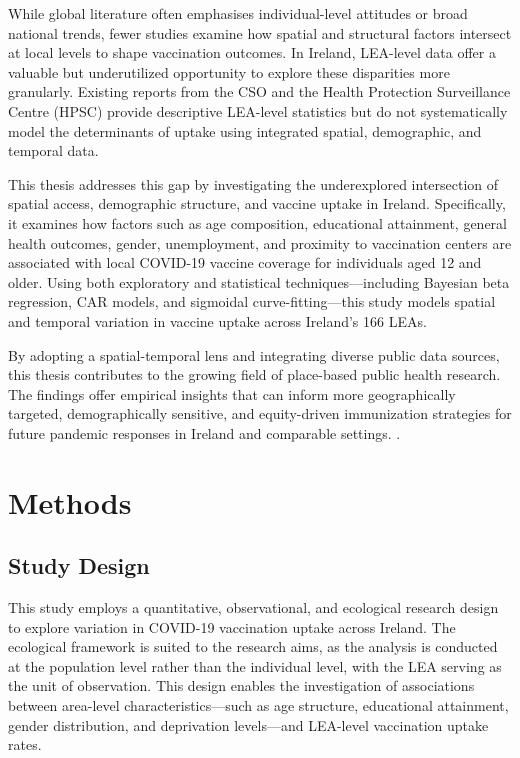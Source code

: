 \documentclass{article}
\begin{document}
While global literature often emphasises individual-level attitudes or
broad national trends, fewer studies examine how spatial and structural
factors intersect at local levels to shape vaccination outcomes. In
Ireland, LEA-level data offer a valuable but underutilized opportunity
to explore these disparities more granularly. Existing reports from the
CSO and the Health Protection Surveillance Centre (HPSC) provide
descriptive LEA-level statistics but do not systematically model the
determinants of uptake using integrated spatial, demographic, and
temporal data.

This thesis addresses this gap by investigating the underexplored
intersection of spatial access, demographic structure, and vaccine
uptake in Ireland. Specifically, it examines how factors such as age
composition, educational attainment, general health outcomes, gender,
unemployment, and proximity to vaccination centers are associated with
local COVID-19 vaccine coverage for individuals aged 12 and older. Using
both exploratory and statistical techniques---including Bayesian beta
regression, CAR models, and sigmoidal curve-fitting---this study models
spatial and temporal variation in vaccine uptake across Ireland's 166
LEAs.

By adopting a spatial-temporal lens and integrating diverse public data
sources, this thesis contributes to the growing field of place-based
public health research. The findings offer empirical insights that can
inform more geographically targeted, demographically sensitive, and
equity-driven immunization strategies for future pandemic responses in
Ireland and comparable settings. .

\section{Methods}\label{methods}

\subsection{Study Design}\label{study-design}

This study employs a quantitative, observational, and ecological
research design to explore variation in COVID-19 vaccination uptake
across Ireland. The ecological framework is suited to the research aims,
as the analysis is conducted at the population level rather than the
individual level, with the LEA serving as the unit of observation. This
design enables the investigation of associations between area-level
characteristics---such as age structure, educational attainment, gender
distribution, and deprivation levels---and LEA-level vaccination uptake
rates.
\end{document}
